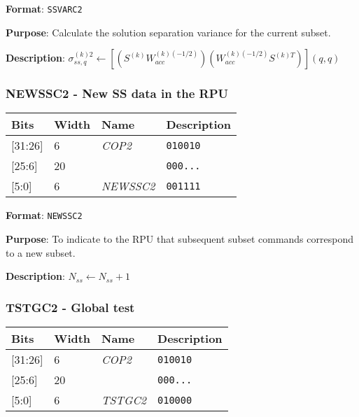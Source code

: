 \documentclass[11pt]{article}
\begin{document}
\textbf{Format}: \texttt{SSVARC2}

\textbf{Purpose}: Calculate the solution separation variance for the current subset.

\textbf{Description}: $\sigma_{ss,q}^{(k)2} \leftarrow [(S^{(k)}W_{acc}^{(k)(-1/2)})(W_{acc}^{(k)(-1/2)}S^{(k)T})](q,q)$

\text{}
\subsubsection{NEWSSC2 - New SS data in the RPU}
\text{}

\begin{table}[H] \centering
  \def\arraystretch{1.4}
  \begin{tabular}{|m{2cm}|m{1.5cm}|m{2.5cm}|m{4.5cm}|}
    \hline
    \textbf{Bits} & \textbf{Width} & \textbf{Name} & \textbf{Description}\\ \hline

    [31:26] & 6 & \emph{COP2} & \texttt{010010}\\ \hline

    [25:6] & 20 & & \texttt{000...}\\ \hline

    [5:0] & 6 & \emph{NEWSSC2} & \texttt{001111}\\ \hline
  \end{tabular}
\end{table}

\textbf{Format}: \texttt{NEWSSC2}

\textbf{Purpose}: To indicate to the RPU that subsequent subset commands correspond to a new subset.

\textbf{Description}: $N_{ss} \leftarrow N_{ss} + 1$

\text{}
\subsubsection{TSTGC2 - Global test}
\text{}

\begin{table}[H] \centering
  \def\arraystretch{1.4}
  \begin{tabular}{|m{2cm}|m{1.5cm}|m{2.5cm}|m{4.5cm}|}
    \hline
    \textbf{Bits} & \textbf{Width} & \textbf{Name} & \textbf{Description}\\ \hline

    [31:26] & 6 & \emph{COP2} & \texttt{010010}\\ \hline

    [25:6] & 20 & & \texttt{000...}\\ \hline

    [5:0] & 6 & \emph{TSTGC2} & \texttt{010000}\\ \hline
  \end{tabular}
\end{table}
\end{document}
